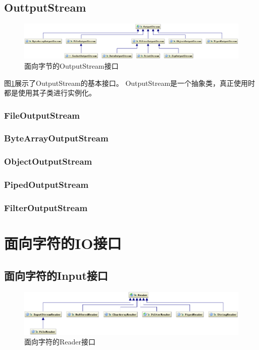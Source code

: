 \documentclass[a4paper,11pt]{article}
\begin{document}
\subsection[OutputStream]{OuttputStream}
\begin{figure}
  \centering
  \includegraphics[width=.9\textwidth]{picturedir/outputstream.png}
  \caption{面向字节的OutputStream接口}
  \label{fig:outputstream}
\end{figure}

图\ref{fig:outputstream}展示了OutputStream的基本接口。
OutputStream是一个抽象类，真正使用时都是使用其子类进行实例化。
\subsubsection[FileOutputStream]{FileOutputStream}
\subsubsection[ByteArrayOutputStream]{ByteArrayOutputStream}
\subsubsection[ObjectOutputStream]{ObjectOutputStream}
\subsubsection[PipedOutputStream]{PipedOutputStream}
\subsubsection[FilterOutputStream]{FilterOutputStream}


\section[面向字符的IO接口]{面向字符的IO接口}
\subsection[面向字符的Input接口]{面向字符的Input接口}
\begin{figure}
  \centering
  \includegraphics[width=.9\textwidth]{picturedir/reader.png}
  \caption{面向字符的Reader接口}
  \label{fig:reader}
\end{figure}
\end{document}
